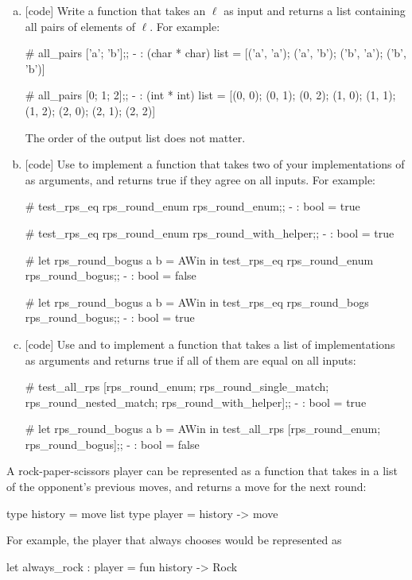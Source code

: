 \documentclass{pset}
\begin{document}
\exercise{}
\begin{enumerate}[(a)]
\item{} [code] Write a function  that takes an
   $\ell$ as input and returns a list containing all
  pairs of elements of $\ell$.  For example:
      \begin{ocaml}
# all_pairs ['a'; 'b'];;
- : (char * char) list = [('a', 'a'); ('a', 'b');
                          ('b', 'a'); ('b', 'b')]

# all_pairs [0; 1; 2];;
- : (int * int) list = [(0, 0); (0, 1); (0, 2); (1, 0);
                        (1, 1); (1, 2); (2, 0); (2, 1); (2, 2)]
      \end{ocaml}

   The order of the output list does not matter.

\item{} [code] Use  to implement a function
   that takes two of your implementations of
   as arguments, and returns true if they agree on all
  inputs.  For example:
\begin{ocaml}
# test_rps_eq rps_round_enum rps_round_enum;;
- : bool = true

# test_rps_eq rps_round_enum rps_round_with_helper;;
- : bool = true

# let rps_round_bogus a b = AWin in
test_rps_eq rps_round_enum rps_round_bogus;;
- : bool = false

# let rps_round_bogus a b = AWin in
test_rps_eq rps_round_bogs rps_round_bogus;;
- : bool = true
\end{ocaml}

\item{} [code] Use  and  to
  implement a function  that takes a list of
   implementations as arguments and returns true if
  all of them are equal on all inputs:
\begin{ocaml}
# test_all_rps [rps_round_enum; rps_round_single_match;
  rps_round_nested_match; rps_round_with_helper];;
- : bool = true

# let rps_round_bogus a b = AWin in
test_all_rps [rps_round_enum; rps_round_bogus];;
- : bool = false
\end{ocaml}
\end{enumerate}

\exercise{} A rock-paper-scissors player can be represented as a
function that takes in a list of the opponent's previous moves, and
returns a move for the next round:
\begin{ocaml}
type history = move list
type player  = history -> move
\end{ocaml}
For example, the player that always chooses  would be
represented as
\begin{ocaml}
let always_rock : player = fun history -> Rock
\end{ocaml}
\end{document}
